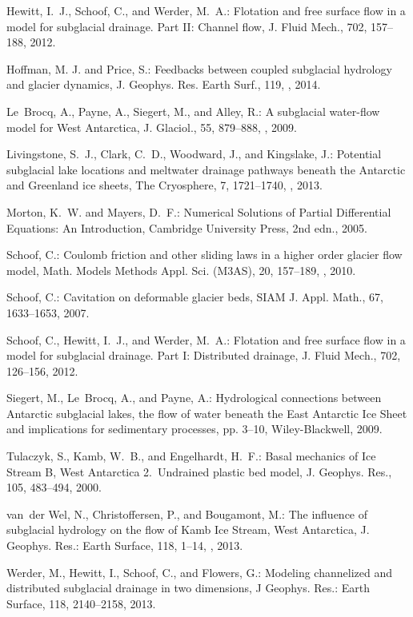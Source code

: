 \documentclass[11pt,reqno]{amsart}
\begin{document}
\begin{thebibliography}{}
Hewitt, I.~J., Schoof, C., and Werder, M.~A.: Flotation and free surface flow
  in a model for subglacial drainage. {P}art {II}: {C}hannel flow, J. Fluid
  Mech., 702, 157--188, 2012.

Hoffman, M. J. and Price, S.: Feedbacks between coupled subglacial hydrology and glacier dynamics, J. Geophys. Res. Earth Surf., 119, , 2014.
  
Le~Brocq, A., Payne, A., Siegert, M., and Alley, R.: A subglacial water-flow
  model for {W}est {A}ntarctica, J. Glaciol., 55, 879--888,
  , 2009.

Livingstone, S.~J., Clark, C.~D., Woodward, J., and Kingslake, J.: Potential
  subglacial lake locations and meltwater drainage pathways beneath the
  {A}ntarctic and {G}reenland ice sheets, The Cryosphere, 7, 1721--1740,
  , 2013.

Morton, K.~W. and Mayers, D.~F.: Numerical {S}olutions of {P}artial
  {D}ifferential {E}quations: {A}n {I}ntroduction, Cambridge University Press,
  2nd edn., 2005.

Schoof, C.: Coulomb friction and other sliding laws in a higher order glacier
  flow model, Math. Models Methods Appl. Sci. (M3AS), 20, 157--189,
  , 2010{}.

Schoof, C.: Cavitation on deformable glacier beds, SIAM J. Appl. Math., 67,
  1633--1653, 2007.

Schoof, C., Hewitt, I.~J., and Werder, M.~A.: Flotation and free surface flow
  in a model for subglacial drainage. {P}art {I}: {D}istributed drainage, J.
  Fluid Mech., 702, 126--156, 2012.

Siegert, M., Le~Brocq, A., and Payne, A.: Hydrological connections between
  Antarctic subglacial lakes, the flow of water beneath the East Antarctic Ice
  Sheet and implications for sedimentary processes, pp. 3--10, Wiley-Blackwell,
  2009.

Tulaczyk, S., Kamb, W.~B., and Engelhardt, H.~F.: Basal mechanics of {I}ce
  {S}tream {B}, {W}est {A}ntarctica 2.~{U}ndrained plastic bed model, J.
  Geophys. Res., 105, 483--494, 2000{}.

van~der Wel, N., Christoffersen, P., and Bougamont, M.: The influence of
  subglacial hydrology on the flow of {K}amb {I}ce {S}tream, {W}est
  {A}ntarctica, J. Geophys. Res.: Earth Surface, 118, 1--14,
  , 2013.

Werder, M., Hewitt, I., Schoof, C., and Flowers, G.: Modeling channelized and
  distributed subglacial drainage in two dimensions, J Geophys. Res.: Earth
  Surface, 118, 2140--2158, 2013.
\end{thebibliography}
\end{document}
